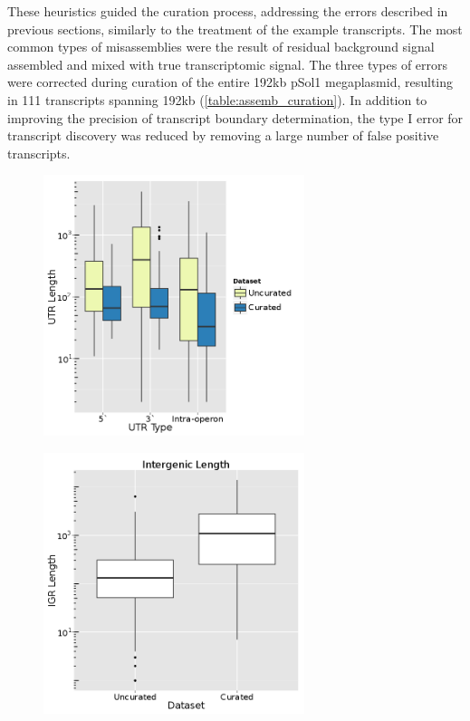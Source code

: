 These heuristics guided the curation process, addressing the errors described in previous sections, similarly to the treatment of the example transcripts. The most common types of misassemblies were the result of residual background signal assembled and mixed with true transcriptomic signal. The three types of errors were corrected during curation of the entire 192kb pSol1 megaplasmid, resulting in 111 transcripts spanning 192kb (\ref{table:assemb_curation}). In addition to improving the precision of transcript boundary determination, the type I error for transcript discovery was reduced by removing a large number of false positive transcripts.

\begin{figure}
\begin{center}
\begin{minipage}{.48\textwidth}
\begin{center}
{\includegraphics[width=\linewidth,height=3in]{images/Assembly/Curation/PairvsCuration_utrlength.png}
\label{fig:5.21a}}
\end{center}
\end{minipage}
\begin{minipage}{.48\textwidth}
\begin{center}
{\includegraphics[width=\linewidth,height=3in]{images/Assembly/Curation/PairvsCuration_igrlength.png}
}
\end{center}
\end{minipage}
\end{center}
\end{figure}
